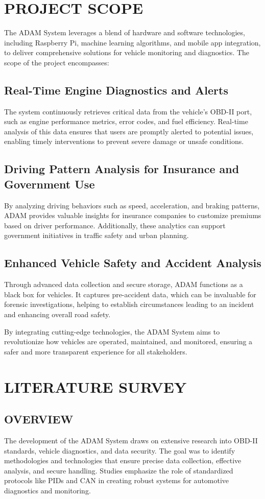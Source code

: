 \section{PROJECT SCOPE}
The ADAM System leverages a blend of hardware and software technologies, including Raspberry Pi, machine learning algorithms, and mobile app integration, to deliver comprehensive solutions for vehicle monitoring and diagnostics. The scope of the project encompasses:

\subsection{Real-Time Engine Diagnostics and Alerts}
The system continuously retrieves critical data from the vehicle's OBD-II port, such as engine performance metrics, error codes, and fuel efficiency. Real-time analysis of this data ensures that users are promptly alerted to potential issues, enabling timely interventions to prevent severe damage or unsafe conditions.

\subsection{Driving Pattern Analysis for Insurance and Government Use}
By analyzing driving behaviors such as speed, acceleration, and braking patterns, ADAM provides valuable insights for insurance companies to customize premiums based on driver performance. Additionally, these analytics can support government initiatives in traffic safety and urban planning.

\subsection{Enhanced Vehicle Safety and Accident Analysis}
Through advanced data collection and secure storage, ADAM functions as a black box for vehicles. It captures pre-accident data, which can be invaluable for forensic investigations, helping to establish circumstances leading to an incident and enhancing overall road safety.

By integrating cutting-edge technologies, the ADAM System aims to revolutionize how vehicles are operated, maintained, and monitored, ensuring a safer and more transparent experience for all stakeholders.

\section{LITERATURE SURVEY}
\subsection{OVERVIEW}
The development of the ADAM System draws on extensive research into OBD-II standards, vehicle diagnostics, and data security. The goal was to identify methodologies and technologies that ensure precise data collection, effective analysis, and secure handling. Studies emphasize the role of standardized protocols like PIDs and CAN in creating robust systems for automotive diagnostics and monitoring.

